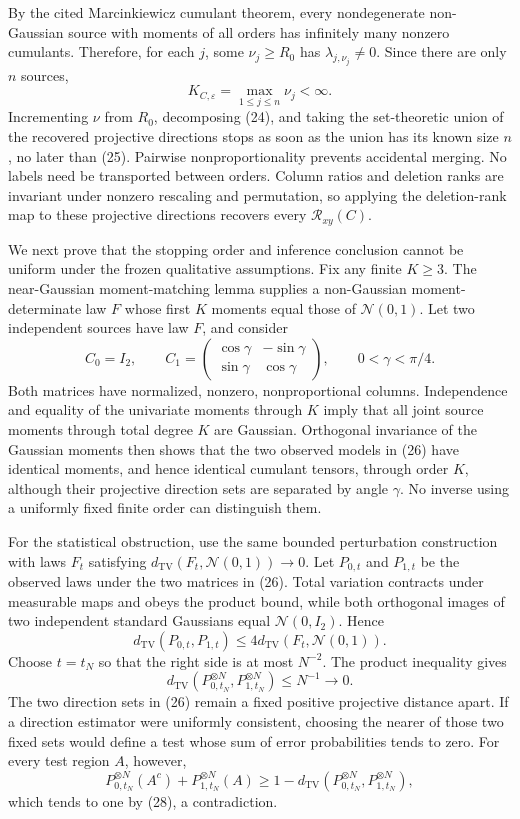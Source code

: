 By the cited Marcinkiewicz cumulant theorem, every nondegenerate non-Gaussian source with moments of all orders has infinitely many nonzero cumulants. Therefore, for each \(j\), some \(\nu_j\ge R_0\) has \(\lambda_{j,\nu_j}\ne0\). Since there are only \(n\) sources,
\[
 K_{C,\varepsilon}=\max_{1\le j\le n}\nu_j<\infty. \tag{25}
\]
Incrementing \(\nu\) from \(R_0\), decomposing (24), and taking the set-theoretic union of the recovered projective directions stops as soon as the union has its known size \(n\), no later than (25). Pairwise nonproportionality prevents accidental merging. No labels need be transported between orders. Column ratios and deletion ranks are invariant under nonzero rescaling and permutation, so applying the deletion-rank map to these projective directions recovers every \(\mathcal R_{xy}(C)\).

We next prove that the stopping order and inference conclusion cannot be uniform under the frozen qualitative assumptions. Fix any finite \(K\ge3\). The near-Gaussian moment-matching lemma supplies a non-Gaussian moment-determinate law \(F\) whose first \(K\) moments equal those of \(\mathcal N(0,1)\). Let two independent sources have law \(F\), and consider
\[
 C_0=I_2,
 \qquad
 C_1=\begin{pmatrix}\cos\gamma&-\sin\gamma\\[2pt]\sin\gamma&\cos\gamma\end{pmatrix},
 \qquad 0<\gamma<\pi/4. \tag{26}
\]
Both matrices have normalized, nonzero, nonproportional columns. Independence and equality of the univariate moments through \(K\) imply that all joint source moments through total degree \(K\) are Gaussian. Orthogonal invariance of the Gaussian moments then shows that the two observed models in (26) have identical moments, and hence identical cumulant tensors, through order \(K\), although their projective direction sets are separated by angle \(\gamma\). No inverse using a uniformly fixed finite order can distinguish them.

For the statistical obstruction, use the same bounded perturbation construction with laws \(F_t\) satisfying \(d_{\mathrm{TV}}(F_t,\mathcal N(0,1))\to0\). Let \(P_{0,t}\) and \(P_{1,t}\) be the observed laws under the two matrices in (26). Total variation contracts under measurable maps and obeys the product bound, while both orthogonal images of two independent standard Gaussians equal \(\mathcal N(0,I_2)\). Hence
\[
 d_{\mathrm{TV}}(P_{0,t},P_{1,t})
 \le4d_{\mathrm{TV}}(F_t,\mathcal N(0,1)). \tag{27}
\]
Choose \(t=t_N\) so that the right side is at most \(N^{-2}\). The product inequality gives
\[
 d_{\mathrm{TV}}(P_{0,t_N}^{\otimes N},P_{1,t_N}^{\otimes N})\le N^{-1}\longrightarrow0. \tag{28}
\]
The two direction sets in (26) remain a fixed positive projective distance apart. If a direction estimator were uniformly consistent, choosing the nearer of those two fixed sets would define a test whose sum of error probabilities tends to zero. For every test region \(A\), however,
\[
 P_{0,t_N}^{\otimes N}(A^c)+P_{1,t_N}^{\otimes N}(A)
 \ge1-d_{\mathrm{TV}}(P_{0,t_N}^{\otimes N},P_{1,t_N}^{\otimes N}),
\]
which tends to one by (28), a contradiction.


